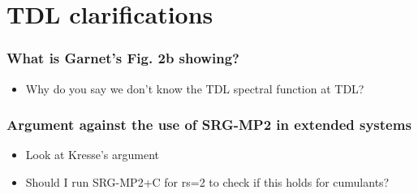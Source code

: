 \section{TDL clarifications}
\begin{frame}
    \frametitle{What is Garnet's Fig. 2b showing?}
    \begin{itemize}
        \item Why do you say we don't know the TDL spectral function at TDL?
    \end{itemize}
\end{frame}
\begin{frame}
    \frametitle{Argument against the use of SRG-MP2 in extended systems}
\begin{itemize}
    \item Look at Kresse's argument
    \item Should I run SRG-MP2+C for rs=2 to check if this holds for cumulants?
\end{itemize}
\end{frame}